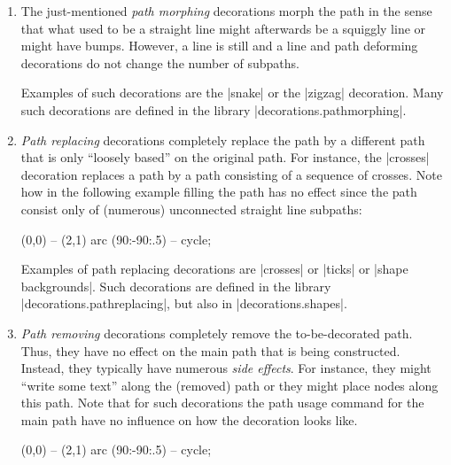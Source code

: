 \begin{enumerate}
    \item The just-mentioned \emph{path morphing} decorations morph the path in
        the sense that what used to be a straight line might afterwards be a
        squiggly line or might have bumps. However, a line is still and a line
        and path deforming decorations do not change the number of subpaths.

        Examples of such decorations are the |snake| or the |zigzag|
        decoration. Many such decorations are defined in the library
        |decorations.pathmorphing|.

    \item \emph{Path replacing} decorations completely replace the path by a
        different path that is only ``loosely based'' on the original path. For
        instance, the |crosses| decoration replaces a path by a path consisting
        of a sequence of crosses. Note how in the following example filling the
        path has no effect since the path consist only of (numerous)
        unconnected straight line subpaths:
\begin{codeexample}[]
\tikz \fill [decorate,decoration={crosses}]
  [fill=blue!20,draw=blue,thick] (0,0) -- (2,1) arc (90:-90:.5) -- cycle;
\end{codeexample}

        Examples of path replacing decorations are |crosses| or |ticks| or
        |shape backgrounds|. Such decorations are defined in the library
        |decorations.pathreplacing|, but also in |decorations.shapes|.
    \item \emph{Path removing} decorations completely remove the
        to-be-decorated path. Thus, they have no effect on the main path that
        is being constructed. Instead, they typically have numerous \emph{side
        effects}. For instance, they might ``write some text'' along the
        (removed) path or they might place nodes along this path. Note that for
        such decorations the path usage command for the main path have no
        influence on how the decoration looks like.
\begin{codeexample}[]
\tikz \fill [decorate,decoration={text along path,
               text=This is a text along a path. Note how the path is lost.}]
  [fill=blue!20,draw=blue,thick] (0,0) -- (2,1) arc (90:-90:.5) -- cycle;
\end{codeexample}
\end{enumerate}

